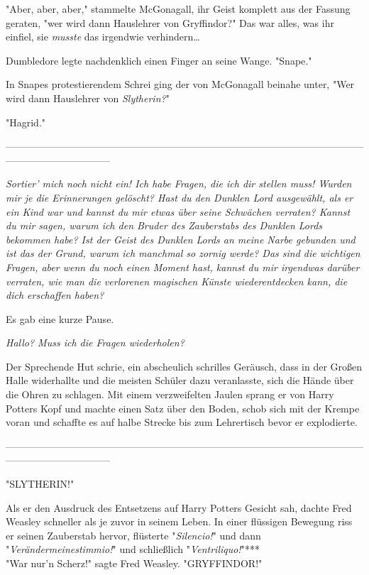 {"Aber, aber, aber," stammelte McGonagall, ihr Geist komplett aus der Fassung geraten, "wer wird dann Hauslehrer von Gryffindor?" Das war alles, was ihr einfiel, sie \emph{musste} das irgendwie verhindern…

Dumbledore legte nachdenklich einen Finger an seine Wange. "Snape."

In Snapes protestierendem Schrei ging der von McGonagall beinahe unter, "Wer wird dann Hauslehrer von \emph{Slytherin?}"

"Hagrid."

--------------------------------------------------------------------------------------------------------------------------------------------

\emph{Sortier' mich noch nicht ein! Ich habe Fragen, die ich dir stellen muss! Wurden mir je die Erinnerungen gelöscht? Hast du den Dunklen Lord ausgewählt, als er ein Kind war und kannst du mir etwas über seine Schwächen verraten? Kannst du mir sagen, warum ich den Bruder des Zauberstabs des Dunklen Lords bekommen habe? Ist der Geist des Dunklen Lords an meine Narbe gebunden und ist das der Grund, warum ich manchmal so zornig werde? Das sind die wichtigen Fragen, aber wenn du noch einen Moment hast, kannst du mir irgendwas darüber verraten, wie man die verlorenen magischen Künste wiederentdecken kann, die dich erschaffen haben?}

Es gab eine kurze Pause.

\emph{Hallo? Muss ich die Fragen wiederholen?}

Der Sprechende Hut schrie, ein abscheulich schrilles Geräusch, dass in der Großen Halle widerhallte und die meisten Schüler dazu veranlasste, sich die Hände über die Ohren zu schlagen. Mit einem verzweifelten Jaulen sprang er von Harry Potters Kopf und machte einen Satz über den Boden, schob sich mit der Krempe voran und schaffte es auf halbe Strecke bis zum Lehrertisch bevor er explodierte.

--------------------------------------------------------------------------------------------------------------------------------------------

"SLYTHERIN!"

Als er den Ausdruck des Entsetzens auf Harry Potters Gesicht sah, dachte Fred Weasley schneller als je zuvor in seinem Leben. In einer flüssigen Bewegung riss er seinen Zauberstab hervor, flüsterte "\emph{Silencio!}" und dann "\emph{Verändermeinestimmio!}" und schließlich "\emph{Ventriliquo!}"***\\ "War nur'n Scherz!" sagte Fred Weasley. "GRYFFINDOR!"

}

